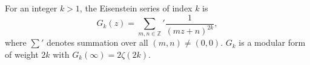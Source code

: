 For an integer $k > 1$, the Eisenstein series of index $k$ is
$$G_k(z) = \sum_{m,n \in \mathbb{Z}}' \frac{1}{(mz + n)^{2k}},$$
where $\sum'$ denotes summation over all $(m,n) \neq (0,0)$. $G_k$ is a modular form of weight $2k$ with $G_k(\infty) = 2\zeta(2k)$.
